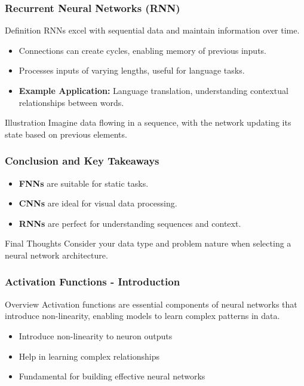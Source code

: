 \documentclass[aspectratio=169]{beamer}
\begin{document}
\begin{frame}[fragile]
    \frametitle{Recurrent Neural Networks (RNN)}
    \begin{block}{Definition}
        RNNs excel with sequential data and maintain information over time.
    \end{block}

    \begin{itemize}
        \item Connections can create cycles, enabling memory of previous inputs.
        \item Processes inputs of varying lengths, useful for language tasks.
        \item \textbf{Example Application:} Language translation, understanding contextual relationships between words.
    \end{itemize}

    \begin{block}{Illustration}
        Imagine data flowing in a sequence, with the network updating its state based on previous elements.
    \end{block}
\end{frame}

\begin{frame}[fragile]
    \frametitle{Conclusion and Key Takeaways}
    \begin{itemize}
        \item \textbf{FNNs} are suitable for static tasks.
        \item \textbf{CNNs} are ideal for visual data processing.
        \item \textbf{RNNs} are perfect for understanding sequences and context.
    \end{itemize}
    
    \begin{block}{Final Thoughts}
        Consider your data type and problem nature when selecting a neural network architecture.
    \end{block}
\end{frame}

\begin{frame}[fragile]
    \frametitle{Activation Functions - Introduction}
    \begin{block}{Overview}
        Activation functions are essential components of neural networks that introduce non-linearity, enabling models to learn complex patterns in data.
    \end{block}
    \begin{itemize}
        \item Introduce non-linearity to neuron outputs
        \item Help in learning complex relationships
        \item Fundamental for building effective neural networks
    \end{itemize}
\end{frame}
\end{document}
